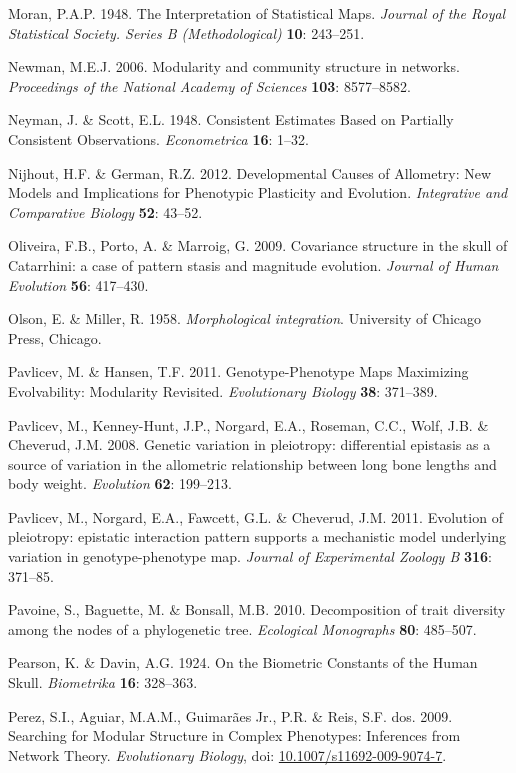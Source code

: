 \documentclass[12pt,twoside]{report}
\begin{document}
Moran, P.A.P. 1948. The Interpretation of Statistical Maps.
\emph{Journal of the Royal Statistical Society. Series B
(Methodological)} \textbf{10}: 243--251.

Newman, M.E.J. 2006. Modularity and community structure in networks.
\emph{Proceedings of the National Academy of Sciences} \textbf{103}:
8577--8582.

Neyman, J. \& Scott, E.L. 1948. Consistent Estimates Based on Partially
Consistent Observations. \emph{Econometrica} \textbf{16}: 1--32.

Nijhout, H.F. \& German, R.Z. 2012. Developmental Causes of Allometry:
New Models and Implications for Phenotypic Plasticity and Evolution.
\emph{Integrative and Comparative Biology} \textbf{52}: 43--52.

Oliveira, F.B., Porto, A. \& Marroig, G. 2009. Covariance structure in
the skull of Catarrhini: a case of pattern stasis and magnitude
evolution. \emph{Journal of Human Evolution} \textbf{56}: 417--430.

Olson, E. \& Miller, R. 1958. \emph{Morphological integration}.
University of Chicago Press, Chicago.

Pavlicev, M. \& Hansen, T.F. 2011. Genotype-Phenotype Maps Maximizing
Evolvability: Modularity Revisited. \emph{Evolutionary Biology}
\textbf{38}: 371--389.

Pavlicev, M., Kenney-Hunt, J.P., Norgard, E.A., Roseman, C.C., Wolf,
J.B. \& Cheverud, J.M. 2008. Genetic variation in pleiotropy:
differential epistasis as a source of variation in the allometric
relationship between long bone lengths and body weight. \emph{Evolution}
\textbf{62}: 199--213.

Pavlicev, M., Norgard, E.A., Fawcett, G.L. \& Cheverud, J.M. 2011.
Evolution of pleiotropy: epistatic interaction pattern supports a
mechanistic model underlying variation in genotype-phenotype map.
\emph{Journal of Experimental Zoology B} \textbf{316}: 371--85.

Pavoine, S., Baguette, M. \& Bonsall, M.B. 2010. Decomposition of trait
diversity among the nodes of a phylogenetic tree. \emph{Ecological
Monographs} \textbf{80}: 485--507.

Pearson, K. \& Davin, A.G. 1924. On the Biometric Constants of the Human
Skull. \emph{Biometrika} \textbf{16}: 328--363.

Perez, S.I., Aguiar, M.A.M., Guimarães Jr., P.R. \& Reis, S.F. dos.
2009. Searching for Modular Structure in Complex Phenotypes: Inferences
from Network Theory. \emph{Evolutionary Biology}, doi:
\href{http://dx.doi.org/10.1007/s11692-009-9074-7}{10.1007/s11692-009-9074-7}.
\end{document}
